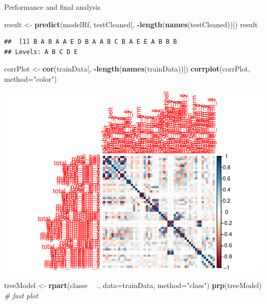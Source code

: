 \documentclass[
]{article}
\newenvironment{Shaded}{\begin{snugshade}}{\end{snugshade}}
\newcommand{\CommentTok}[1]{\textcolor[rgb]{0.56,0.35,0.01}{\textit{#1}}}
\newcommand{\DataTypeTok}[1]{\textcolor[rgb]{0.13,0.29,0.53}{#1}}
\newcommand{\KeywordTok}[1]{\textcolor[rgb]{0.13,0.29,0.53}{\textbf{#1}}}
\newcommand{\NormalTok}[1]{#1}
\newcommand{\OperatorTok}[1]{\textcolor[rgb]{0.81,0.36,0.00}{\textbf{#1}}}
\newcommand{\StringTok}[1]{\textcolor[rgb]{0.31,0.60,0.02}{#1}}
\begin{document}
Performance and final analysis

\begin{Shaded}
\begin{Highlighting}[]
\NormalTok{result <-}\StringTok{ }\KeywordTok{predict}\NormalTok{(modelRf, testCleaned[, }\OperatorTok{-}\KeywordTok{length}\NormalTok{(}\KeywordTok{names}\NormalTok{(testCleaned))])}
\NormalTok{result}
\end{Highlighting}
\end{Shaded}

\begin{verbatim}
##  [1] B A B A A E D B A A B C B A E E A B B B
## Levels: A B C D E
\end{verbatim}

\begin{Shaded}
\begin{Highlighting}[]
\NormalTok{corrPlot <-}\StringTok{ }\KeywordTok{cor}\NormalTok{(trainData[, }\OperatorTok{-}\KeywordTok{length}\NormalTok{(}\KeywordTok{names}\NormalTok{(trainData))])}
\KeywordTok{corrplot}\NormalTok{(corrPlot, }\DataTypeTok{method=}\StringTok{"color"}\NormalTok{)}
\end{Highlighting}
\end{Shaded}

\includegraphics{pracmachlearn_files/figure-latex/unnamed-chunk-9-1.pdf}

\begin{Shaded}
\begin{Highlighting}[]
\NormalTok{treeModel <-}\StringTok{ }\KeywordTok{rpart}\NormalTok{(classe }\OperatorTok{~}\StringTok{ }\NormalTok{., }\DataTypeTok{data=}\NormalTok{trainData, }\DataTypeTok{method=}\StringTok{"class"}\NormalTok{)}
\KeywordTok{prp}\NormalTok{(treeModel) }\CommentTok{# fast plot}
\end{Highlighting}
\end{Shaded}
\end{document}
